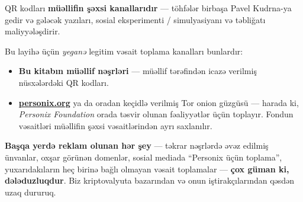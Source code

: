 \begin{minipage}[t]{0.60\textwidth}
\vspace{0pt}
\begin{mdframed}[
  linewidth=0.7pt,roundcorner=5pt,
  innerleftmargin=10pt,innerrightmargin=10pt,
  innertopmargin=8pt,innerbottommargin=8pt,
  skipabove=0pt,skipbelow=0pt,
  linecolor=cbwarning!50,backgroundcolor=cbwarning!5,
  nobreak=true,
  needspace=4\baselineskip,
]
\footnotesize
QR kodları \textbf{müəllifin şəxsi kanallarıdır} --- töhfələr birbaşa Pavel Kudrna-ya gedir və gələcək yazıları, sosial eksperimenti / simulyasiyanı və təbliğatı maliyyələşdirir.

\smallskip
Bu layihə üçün \emph{yeganə} legitim vəsait toplama kanalları bunlardır:

\smallskip
\begin{itemize}
\setlength{\itemsep}{0pt}
\setlength{\topsep}{0pt}
\item \textbf{Bu kitabın müəllif nəşrləri} --- müəllif tərəfindən icazə verilmiş nüsxələrdəki QR kodları.
\item \href{https://personix.org}{\textbf{personix.org}} ya da oradan keçidlə verilmiş Tor onion güzgüsü --- harada ki, \emph{Personix Foundation} orada təsvir olunan fəaliyyətlər üçün toplayır. Fondun vəsaitləri müəllifin şəxsi vəsaitlərindən ayrı saxlanılır.
\end{itemize}

\smallskip
\textbf{Başqa yerdə reklam olunan hər şey} --- təkrar nəşrlərdə əvəz edilmiş ünvanlar, oxşar görünən domenlər, sosial mediada ``Personix üçün toplama'', yuxarıdakıların heç birinə bağlı olmayan vəsait toplamalar --- \textbf{çox güman ki, dələduzluqdur}. Biz kriptovalyuta bazarından və onun iştirakçılarından qəsdən uzaq dururuq.
\end{mdframed}
\end{minipage}

\clearpage
